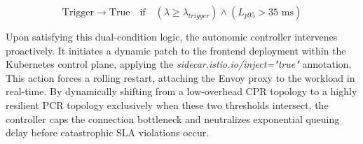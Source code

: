 \documentclass{ieeeaccess}
\begin{document}
$$\text{Trigger} \rightarrow \text{True} \quad \text{if} \quad (\lambda \ge \lambda_{trigger}) \land (L_{p95} > 35\text{ ms})$$

Upon satisfying this dual-condition logic, the autonomic controller intervenes proactively. It initiates a dynamic patch to the frontend deployment within the Kubernetes control plane, applying the \textit{sidecar.istio.io/inject="true"} annotation. This action forces a rolling restart, attaching the Envoy proxy to the workload in real-time. By dynamically shifting from a low-overhead CPR topology to a highly resilient PCR topology exclusively when these two thresholds intersect, the controller caps the connection bottleneck and neutralizes exponential queuing delay before catastrophic SLA violations occur.
\end{document}
